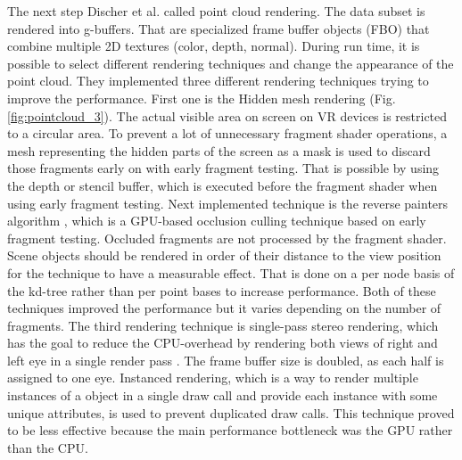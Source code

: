 \documentclass[10pt,twocolumn,letterpaper]{article}
\begin{document}
\setlength{\parindent}{1pc}The next step Discher et al. \cite{discher_point-based_2018} called point cloud rendering. The data subset is rendered into g-buffers. That are specialized frame buffer objects (FBO) that combine multiple 2D textures (color, depth, normal). During run time, it is possible to select different rendering techniques and change the appearance of the point cloud. They implemented three different rendering techniques trying to improve the performance. First one is the Hidden mesh rendering (Fig. \ref{fig:pointcloud_3}). The actual visible area on screen on VR devices is restricted to a circular area. To prevent a lot of unnecessary fragment shader operations, a mesh representing the hidden parts of the screen as a mask is used to discard those fragments early on \cite{vlachos_advanced_2015} with early fragment testing. That is possible by using the depth or stencil buffer, which is executed before the fragment shader when using early fragment testing. Next implemented technique is the reverse painters algorithm \cite{foley1996computer}, which is a GPU-based occlusion culling technique based on early fragment testing. Occluded fragments  are not processed by the fragment shader. Scene objects should be rendered in order of their distance to the view position for the technique to have a measurable effect. That is done on a per node basis of the kd-tree rather than per point bases to increase performance. Both of these techniques improved the performance but it varies depending on the number of fragments. The third rendering technique is single-pass stereo rendering, which has the goal to reduce the CPU-overhead by rendering both views of right and left eye in a single render pass \cite{johansson2016efficient}. The frame buffer size is doubled, as each half is assigned to one eye. Instanced rendering, which is a way to render multiple instances of a object in a single draw call and provide each instance with some unique attributes, is used to prevent duplicated draw calls. This technique proved to be less effective because the main performance bottleneck was the GPU rather than the CPU. 
\end{document}
